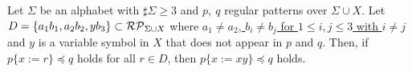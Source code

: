 
\begin{lem}\label{lem:3consts_ii}
  Let $\Sigma$ be an alphabet with $\sharp\Sigma \ge 3$ and $p,~q$ regular patterns {\color{red}over} $\Sigma\cup X$.
  {\color{red} Let $D= \{ a_{1}b_{1}, a_{2}b_{2}, yb_{3}\}\subset \mathcal{RP}_{\Sigma\cup X}$
  where \underline{$a_{1}\neq a_{2}$, $b_{i}\neq b_{j}$ for $1\leq i,j\leq 3$ with $i\neq j$}\\ and $y$ is a variable symbol in $X$ that does not appear in $p$ and $q$.
  Then, if $p \{ x := r \} \preceq q$ holds for all $r \in D$,
then $p \{ x := xy \} \preceq q$ holds.}
\end{lem}

